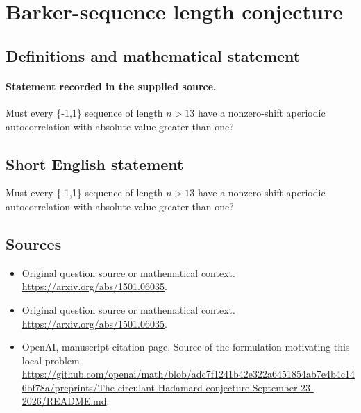 \documentclass[11pt]{article}
\begin{document}
\section*{Barker-sequence length conjecture}\label{statement}
\subsection{Definitions and mathematical statement}
\paragraph{Statement recorded in the supplied source.}
Must every \{-1,1\} sequence of length $n>13$ have a nonzero-shift aperiodic autocorrelation with absolute value greater than one?
\subsection{Short English statement}
Must every \{-1,1\} sequence of length $n>13$ have a nonzero-shift aperiodic autocorrelation with absolute value greater than one?
\subsection{Sources}
\begin{itemize}
\item[S1] Original question source or mathematical context.
\url{https://arxiv.org/abs/1501.06035}.
\item[S2] Original question source or mathematical context.
\url{https://arxiv.org/abs/1501.06035}.
\item[S3] OpenAI, manuscript citation page. Source of the formulation motivating this local problem.
\url{https://github.com/openai/math/blob/adc7f1241b42e322a6451854ab7e4b4c146bf78a/preprints/The-circulant-Hadamard-conjecture-September-23-2026/README.md}.
\end{itemize}
\end{document}
